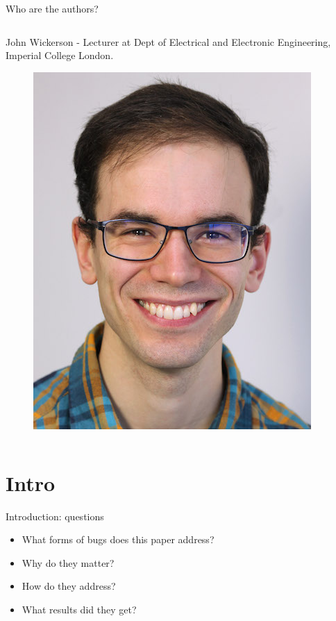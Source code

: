 \documentclass[xcolor=dvipsnames]{beamer}
\begin{document}
\begin{frame}{Who are the authors?}
\begin{columns}
            \begin{column}[]{0.5\textwidth}
                John Wickerson - Lecturer at Dept of Electrical and Electronic Engineering, Imperial College London.
                \begin{figure}
                    \includegraphics[scale=0.2]{john.jpg}
                \end{figure}
                
            \end{column}



        \end{columns}
        
    \end{frame}


    \logo{}



    \section{Intro}
    \begin{frame}{Introduction: questions}

        \begin{itemize}
            \item What forms of bugs does this paper address? 
            \item Why do they matter? 
            \item How do they address? 
            \item What results did they get?  
        \end{itemize}
        
    \end{frame}
\end{document}

